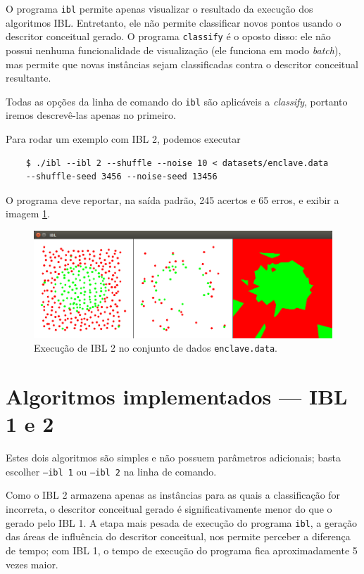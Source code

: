 \documentclass{article}
\begin{document}
O programa \texttt{ibl} permite apenas visualizar
o resultado da execução dos algoritmos IBL.
Entretanto, ele não permite classificar novos pontos
usando o descritor conceitual gerado.
O programa \texttt{classify} é o oposto disso:
ele não possui nenhuma funcionalidade de visualização
(ele funciona em modo \emph{batch}),
mas permite que novas instâncias sejam classificadas
contra o descritor conceitual resultante.

Todas as opções da linha de comando do \texttt{ibl}
são aplicáveis a \emph{classify}, portanto iremos descrevê-las apenas no primeiro.

Para rodar um exemplo com IBL 2, podemos executar
\begin{verbatim}
    $ ./ibl --ibl 2 --shuffle --noise 10 < datasets/enclave.data
    --shuffle-seed 3456 --noise-seed 13456
\end{verbatim}
O programa deve reportar, na saída padrão, 245 acertos e 65 erros,
e exibir a imagem \ref{iblimg}.

\begin{figure}[h]
    \centering
    \includegraphics[scale=0.3]{ibl.png}
    \caption{Execução de IBL 2 no conjunto de dados \texttt{enclave.data}.}
    \label{iblimg}
\end{figure}

\section{Algoritmos implementados --- IBL 1 e 2}

Estes dois algoritmos são simples e não possuem parâmetros adicionais;
basta escolher \texttt{--ibl 1} ou \texttt{--ibl 2} na linha de comando.

Como o IBL 2 armazena apenas as instâncias para as quais a classificação for incorreta,
o descritor conceitual gerado é significativamente menor do que o gerado pelo IBL 1.
A etapa mais pesada de execução do programa \texttt{ibl},
a geração das áreas de influência do descritor conceitual,
nos permite perceber a diferença de tempo;
com IBL 1, o tempo de execução do programa fica aproximadamente 5 vezes maior.
\end{document}
